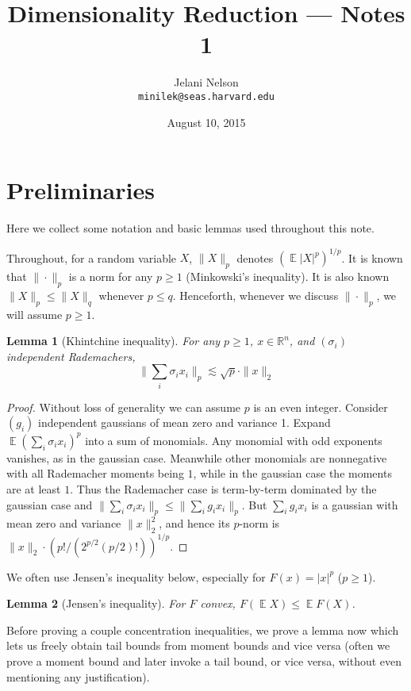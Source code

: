 \documentclass[12pt]{article}
\author{Jelani Nelson\\{}\texttt{minilek@seas.harvard.edu}}
\title{Dimensionality Reduction --- Notes 1}
\date{August 10, 2015}
\DeclareMathOperator*{\E}{\mathbb{E}}
\newcommand{\R}{\mathbb{R}}
\newtheorem{lemma}{Lemma}
\begin{document}
\maketitle

\section{Preliminaries}

Here we collect some notation and basic lemmas used throughout this note.

Throughout, for a random variable $X$, $\|X\|_p$ denotes $(\E|X|^p)^{1/p}$. It is known that $\|\cdot\|_p$ is a norm for any $p\ge 1$ (Minkowski's inequality). It is also known $\|X\|_p \le \|X\|_q$ whenever $p\le q$. Henceforth, whenever we discuss $\|\cdot\|_p$, we will assume $p\ge 1$.

\begin{lemma}[Khintchine inequality]
For any $p\ge 1$, $x\in\R^n$, and $(\sigma_i)$ independent Rademachers,
$$
\|\sum_i \sigma_i x_i\|_p \lesssim \sqrt{p}\cdot \|x\|_2
$$
\end{lemma}
\begin{proof}
  Without loss of generality we can assume $p$ is an even integer. Consider $(g_i)$ independent gaussians of mean zero and variance 1. Expand $\E (\sum_i \sigma_i x_i)^p$ into a sum of monomials. Any monomial with odd exponents vanishes, as in the gaussian case. Meanwhile other monomials are nonnegative with all Rademacher moments being $1$, while in the gaussian case the moments are at least $1$. Thus the Rademacher case is term-by-term dominated by the gaussian case and $\|\sum_i \sigma_i x_i\|_p \le \|\sum_i g_i x_i\|_p$. But $\sum_i g_i x_i$ is a gaussian with mean zero and variance $\|x\|_2^2$, and hence its $p$-norm is $\|x\|_2 \cdot (p! / (2^{p/2} (p/2)!))^{1/p}$.
\end{proof}

We often use Jensen's inequality below, especially for $F(x) = |x|^p$ ($p\ge 1$).

\begin{lemma}[Jensen's inequality]
For $F$ convex, $F(\E X) \le \E F(X)$.
\end{lemma}

Before proving a couple concentration inequalities, we prove a lemma now which lets us freely obtain tail bounds from moment bounds and vice versa (often we prove a moment bound and later invoke a tail bound, or vice versa, without even mentioning any justification).
\end{document}
